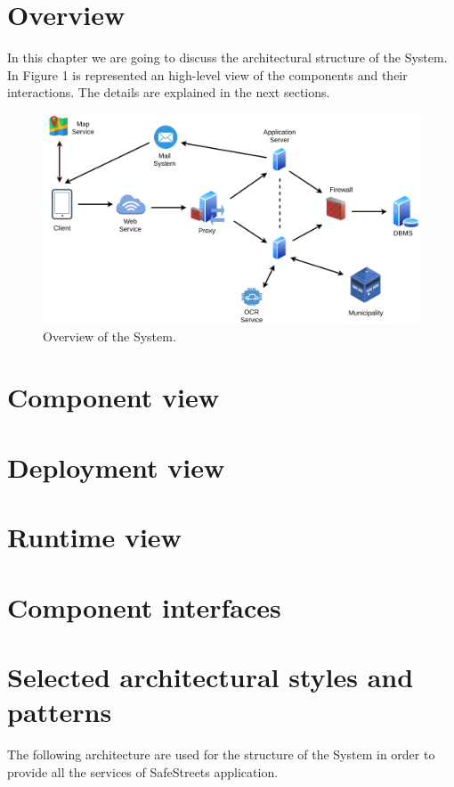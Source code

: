 \documentclass{report}
\begin{document}
\section{Overview}
In this chapter we are going to discuss the architectural structure of the System. In Figure 1 is represented an high-level view of the components and their interactions. The details are explained in the next sections.
\begin{figure}[!ht]
	\begin{center}
	\includegraphics[width=\textwidth]{img/HighLevelOverview.png}
	\end{center}
	\caption{Overview of the System.}
\end{figure}

\section{Component view}

\section{Deployment view}

\section{Runtime view}

\section{Component interfaces}

\section{Selected architectural	styles and patterns}
The following architecture are used for the structure of the System in order to provide all the services of SafeStreets application.
\end{document}
